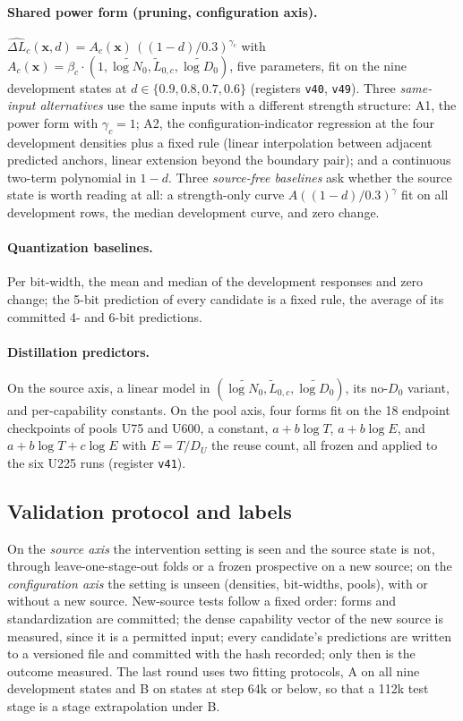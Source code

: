 \paragraph{Shared power form (pruning, configuration axis).}
$\widehat{\Delta L}_c(\mathbf x,d)=A_c(\mathbf x)\,((1-d)/0.3)^{\gamma_c}$
with $A_c(\mathbf x)=\beta_c\cdot(1,\tilde{\log N_0},\tilde L_{0,c},\tilde{\log D_0})$,
five parameters, fit on the nine development states at
$d\in\{0.9,0.8,0.7,0.6\}$ (registers \texttt{v40}, \texttt{v49}). Three
\emph{same-input alternatives} use the same inputs with a different
strength structure: A1, the power form with $\gamma_c=1$; A2, the
configuration-indicator regression at the four development densities
plus a fixed rule (linear interpolation between adjacent predicted
anchors, linear extension beyond the boundary pair); and a continuous
two-term polynomial in $1-d$. Three \emph{source-free baselines} ask
whether the source state is worth reading at all: a strength-only
curve $A((1-d)/0.3)^{\gamma}$ fit on all development rows, the median
development curve, and zero change.

\paragraph{Quantization baselines.} Per bit-width, the mean and median
of the development responses and zero change; the 5-bit prediction of
every candidate is a fixed rule, the average of its committed 4- and
6-bit predictions.

\paragraph{Distillation predictors.} On the source axis, a linear model
in $(\tilde{\log N_0},\tilde L_{0,c},\tilde{\log D_0})$, its no-$D_0$
variant, and per-capability constants. On the pool axis, four forms
fit on the 18 endpoint checkpoints of pools U75 and U600, a constant,
$a+b\log T$, $a+b\log E$, and $a+b\log T+c\log E$ with $E=T/D_U$ the
reuse count, all frozen and applied to the six U225 runs (register
\texttt{v41}).

\subsection{Validation protocol and labels}
\label{sec:protocol}

On the \emph{source axis} the intervention setting is seen and the
source state is not, through leave-one-stage-out folds or a frozen
prospective on a new source; on the \emph{configuration axis} the
setting is unseen (densities, bit-widths, pools), with or without a
new source. New-source tests follow a fixed order: forms and
standardization are committed; the dense capability vector of the new
source is measured, since it is a permitted input; every candidate's
predictions are written to a versioned file and committed with the
hash recorded; only then is the outcome measured. The last round uses
two fitting protocols, A on all nine development states and B on
states at step 64k or below, so that a 112k test stage is a stage
extrapolation under B.

